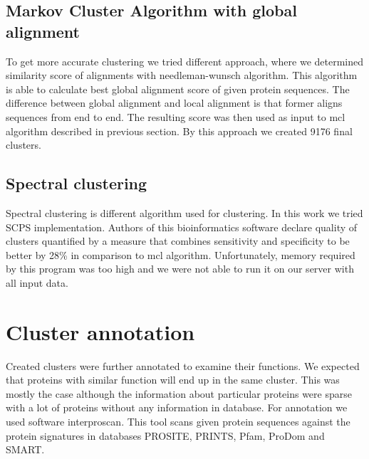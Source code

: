 \subsection{Markov Cluster Algorithm with global alignment}
To get more accurate clustering we tried different approach, where we determined similarity score of alignments with needleman-wunsch algorithm. \cite{needleman-wunsch}
This algorithm is able to calculate best global alignment score of given protein sequences.
The difference between global alignment and local alignment is that former aligns sequences from end to end.
The resulting score was then used as input to mcl algorithm described in previous section.
By this approach we created 9176 final clusters.

\subsection{Spectral clustering}
Spectral clustering is different algorithm used for clustering.
In this work we tried SCPS implementation\cite{scps}.
Authors of this bioinformatics software declare quality of clusters quantified by a measure that combines sensitivity and specificity to be better by 28\% in comparison to mcl algorithm.
Unfortunately, memory required by this program was too high and we were not able to run it on our server with all input data. 

\section{Cluster annotation}
Created clusters were further annotated to examine their functions.
We expected that proteins with similar function will end up in the same cluster. 
This was mostly the case although the information about particular proteins were sparse with a lot of proteins without any information in database.
For annotation we used software interproscan\cite{interpro}.
This tool scans given protein sequences against the protein signatures in databases PROSITE, PRINTS, Pfam, ProDom and SMART.

